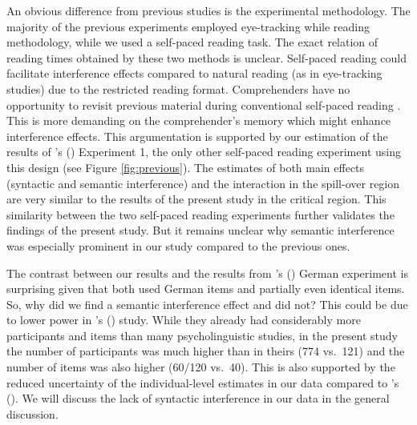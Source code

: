 \documentclass[a4paper, man, floatsintext]{apa7}
\begin{document}
An obvious difference from previous studies is the experimental methodology. The majority of the previous experiments employed eye-tracking while reading methodology, while we used a self-paced reading task. The exact relation of reading times obtained by these two methods is unclear. Self-paced reading could facilitate interference effects compared to natural reading (as in eye-tracking studies) due to the restricted reading format. Comprehenders have no opportunity to revisit previous material during conventional self-paced reading  \citep[but see][]{BSPR}. This is more demanding on the comprehender's memory which might enhance interference effects. This argumentation is supported by our estimation of the results of \citeauthor{vandyke07}'s (\citeyear{vandyke07}) Experiment 1, the only other self-paced reading experiment using this design (see Figure \ref{fig:previous}). The estimates of both main effects (syntactic and semantic interference) and the interaction in the spill-over region are very similar to the results of the present study in the critical region. This similarity between the two self-paced reading experiments further validates the findings of the present study. But it remains unclear why semantic interference was especially prominent in our study compared to the previous ones.

The contrast between our results and the results from  \citeauthor{mertzen}'s (\citeyear{mertzen}) German experiment is surprising given that both used German items and partially even identical items. So, why did we find a semantic interference effect and \citet{mertzen} did not? This could be due to lower power in \citeauthor{mertzen}'s (\citeyear{mertzen}) study. While they already had considerably more participants and items than many psycholinguistic studies, in the present study the number of participants was much higher than in theirs (774 vs.\ 121) and the number of items was also higher (60/120 vs.\ 40). This is also supported by the reduced uncertainty of the individual-level estimates in our data compared to \citeauthor{mertzen}'s (\citeyear{mertzen}). We will discuss the lack of syntactic interference in our data in the general discussion.
\end{document}
